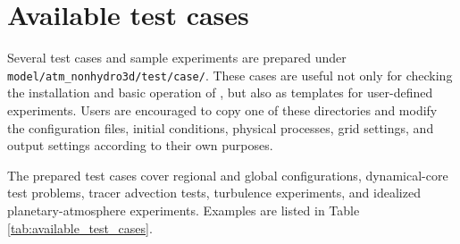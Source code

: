 \section{Available test cases}
\label{sec:available_test_cases}

Several test cases and sample experiments are prepared under
\verb|model/atm_nonhydro3d/test/case/|.
These cases are useful not only for checking the installation and basic
operation of \scaledg, but also as templates for user-defined experiments.
Users are encouraged to copy one of these directories and modify the
configuration files, initial conditions, physical processes, grid settings,
and output settings according to their own purposes.

The prepared test cases cover regional and global configurations, dynamical-core
test problems, tracer advection tests, turbulence experiments, and idealized
planetary-atmosphere experiments.
Examples are listed in Table \ref{tab:available_test_cases}.


